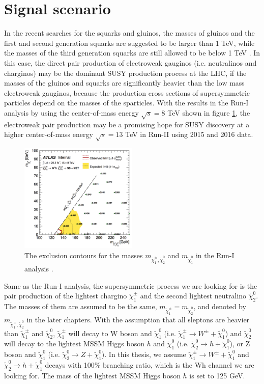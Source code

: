 \section{Signal scenario}
\label{sec:Wh_signal}
In the recent searches for the squarks and gluinos, the masses of gluinos and the first and second generation squarks are suggested to be larger than 1 TeV, while the masses of the third generation squarks are still allowed to be below 1 TeV \cite{gluinos}.
In this case, the direct pair production of electroweak gauginos (i.e. neutralinos and charginos) may be the dominant SUSY production process at the LHC, if the masses of the gluinos and squarks are significantly heavier than the low mass electroweak gauginos, because the production cross sections of supersymmetric particles depend on the masses of the sparticles.
With the results in the Run-I analysis \cite{run1} by using the center-of-mass energy $\sqrt{s} = 8$ TeV shown in figure \ref{fig:result_run1}, the electroweak pair production may be a promising hope for SUSY discovery at a higher center-of-mass energy $\sqrt{s} = 13$ TeV in Run-II using 2015 and 2016 data.

\begin{figure}
\centering
\includegraphics[width=0.5\textwidth]{data/photo/theory/run1.png}
\caption{The exclusion contours for the masses $m_{\tilde{\chi}_1^\pm , \tilde{\chi}_2^0}$ and $m_{\tilde{\chi}_1^0}$ in the Run-I analysis \cite{run1}.}
\label{fig:result_run1}
\end{figure}

Same as the Run-I analysis, the supersymmetric process we are looking for is the pair production of the lightest chargino $\tilde{\chi}_1^\pm$ and the second lightest neutralino $\tilde{\chi}_2^0$.
The masses of them are assumed to be the same, $m_{\tilde{\chi}_1^\pm} = m_{\tilde{\chi}_2^0}$, and denoted by $m_{\tilde{\chi}_1^\pm , \tilde{\chi}_2^0}$ in the later chapters.
With the assumption that all sleptons are heavier than $\tilde{\chi}_1^\pm$ and $\tilde{\chi}_2^0$,
$\tilde{\chi}_1^\pm$ will decay to W boson and $\tilde{\chi}_1^0$ (i.e. $\tilde{\chi}_1^\pm \rightarrow W^{\pm} + \tilde{\chi}_1^0$)
and $\tilde{\chi}_2^0$ will decay to the lightest MSSM Higgs boson $h$ and $\tilde{\chi}_1^0$ (i.e. $\tilde{\chi}_2^0 \rightarrow h + \tilde{\chi}_1^0$),
or Z boson and $\tilde{\chi}_1^0$ (i.e. $\tilde{\chi}_2^0 \rightarrow Z + \tilde{\chi}_1^0$).
In this thesis, we assume $\tilde{\chi}_1^\pm \rightarrow W^{\pm} + \tilde{\chi}_1^0$ and $\tilde{\chi}_2^0 \rightarrow h + \tilde{\chi}_1^0$ decays with 100\% branching ratio, which is the Wh channel we are looking for.
The mass of the lightest MSSM Higgs boson $h$ is set to 125 GeV.

